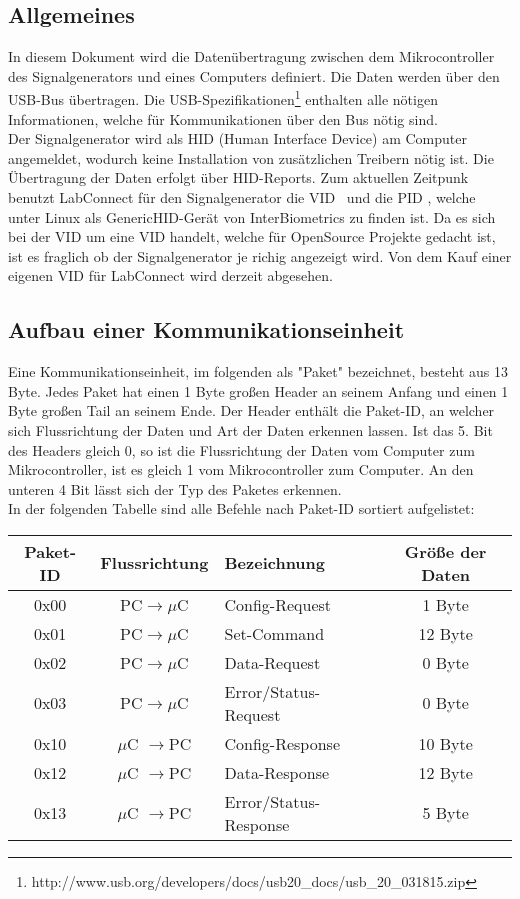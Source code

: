 \subsection{Allgemeines}
In diesem Dokument wird die Datenübertragung zwischen dem Mikrocontroller des Signalgenerators und eines Computers definiert. Die Daten werden über den USB-Bus übertragen. Die USB-Spezifikationen\footnote{http://www.usb.org/developers/docs/usb20\_docs/usb\_20\_031815.zip} enthalten alle nötigen Informationen, welche für Kommunikationen über den Bus nötig sind.\\
Der Signalgenerator wird als HID (Human Interface Device) am Computer angemeldet, wodurch keine Installation von zusätzlichen Treibern nötig ist. Die Übertragung der Daten erfolgt über HID-Reports. Zum aktuellen Zeitpunk benutzt LabConnect für den Signalgenerator die VID \VID\ und die PID \PID, welche unter Linux als GenericHID-Gerät von InterBiometrics zu finden ist. Da es sich bei der VID um eine VID handelt, welche für OpenSource Projekte gedacht ist, ist es fraglich ob der Signalgenerator je richig angezeigt wird. Von dem Kauf einer eigenen VID für LabConnect wird derzeit abgesehen.

\subsection{Aufbau einer Kommunikationseinheit}
Eine Kommunikationseinheit, im folgenden als "Paket" bezeichnet, besteht aus 13 Byte. Jedes Paket hat einen 1 Byte großen Header an seinem Anfang und einen 1 Byte großen Tail an seinem Ende. Der Header enthält die Paket-ID, an welcher sich Flussrichtung der Daten und Art der Daten erkennen lassen. Ist das 5. Bit des Headers gleich 0, so ist die Flussrichtung der Daten vom Computer zum Mikrocontroller, ist es gleich 1 vom Mikrocontroller zum Computer. An den unteren 4 Bit lässt sich der Typ des Paketes erkennen.\\
In der folgenden Tabelle sind alle Befehle nach Paket-ID sortiert aufgelistet:\\

\begin{tabular}{c||c|l|c}
Paket-ID & Flussrichtung & Bezeichnung & Größe der Daten \\ 
\hline 
\hline
0x00 & PC$\rightarrow \mu$C & Config-Request & 1 Byte \\ 
\hline 
0x01 & PC$\rightarrow \mu$C & Set-Command & 12 Byte \\ 
\hline 
0x02 & PC$\rightarrow \mu$C & Data-Request & 0 Byte \\ 
\hline 
0x03 & PC$\rightarrow \mu$C & Error/Status-Request & 0 Byte \\ 
\hline 
0x10 & $\mu$C $\rightarrow$PC & Config-Response & 10 Byte \\  
\hline 
0x12 & $\mu$C $\rightarrow$PC & Data-Response & 12 Byte \\ 
\hline
0x13 & $\mu$C $\rightarrow$PC & Error/Status-Response & 5 Byte \\ 
\end{tabular}


